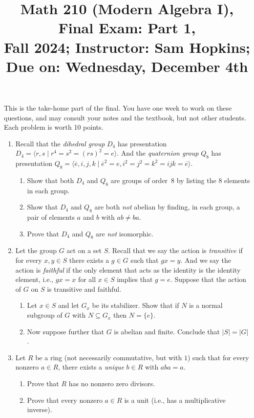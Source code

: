 \documentclass[11pt]{article}
\title{Math 210 (Modern Algebra I), Final Exam: Part 1, \\ {\normalsize Fall 2024; Instructor: Sam Hopkins; Due on: Wednesday, December 4th}}
\date{}
\begin{document}
\maketitle

This is the take-home part of the final. You have one week to work on these questions, and may consult your notes and the textbook, but not other students. Each problem is worth 10 points. 

\thispagestyle{empty}
\begin{enumerate}

\item Recall that the \emph{dihedral group} $D_4$ has presentation $D_4 = \langle r,s \mid r^4 = s^2 = (rs)^2 = e\rangle$. And the \emph{quaternion group} $Q_8$ has presentation $Q_8 = \langle \overline{e}, i, j, k\mid \overline{e}^2 = e, i^2 = j^2 = k^2 = ijk = \overline{e}\rangle$.
\begin{enumerate}
\item Show that both $D_4$ and $Q_8$ are groups of order~$8$ by listing the $8$ elements in each group.
\item Show that $D_4$ and $Q_8$ are both \emph{not} abelian by finding, in each group, a pair of elements $a$ and $b$ with $ab \neq ba$.
\item Prove that $D_4$ and $Q_8$ are \emph{not} isomorphic.
\end{enumerate}

\item Let the group $G$ act on a set $S$. Recall that we say the action is \emph{transitive} if for every $x,y \in S$ there exists a $g \in G$ such that $gx = y$. And we say the action is \emph{faithful} if the only element that acts as the identity is the identity element, i.e., $gx = x$ for all $x \in S$ implies that $g=e$. Suppose that the action of $G$ on $S$ is transitive and faithful.
\begin{enumerate}
\item Let $x \in S$ and let $G_x$ be its stabilizer. Show that if $N$ is a normal subgroup of $G$ with $N\subseteq G_x$ then $N=\{e\}$.
\item Now suppose further that $G$ is abelian and finite. Conclude that $|S| = |G|$.
\end{enumerate}

\item Let $R$ be a ring (not necessarily commutative, but with $1$) such that for every nonzero $a\in R$, there exists a \emph{unique} $b\in R$ with $aba = a$.
\begin{enumerate}
\item Prove that $R$ has no nonzero zero divisors.
\item Prove that every nonzero $a \in R$ is a unit (i.e., has a multiplicative inverse).
\end{enumerate}


\end{enumerate}
\end{document}
